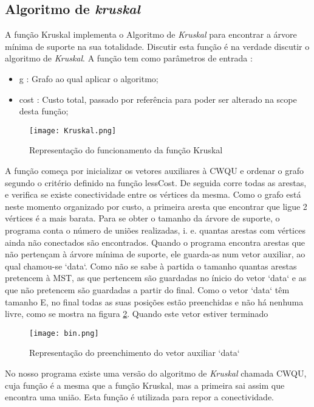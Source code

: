 \documentclass[14pt]{article}
\begin{document}
    \subsection[Kruskal]{Algoritmo de \emph{kruskal}} 
    A função Kruskal implementa o Algoritmo de \emph{Kruskal} para encontrar a árvore mínima de suporte na sua totalidade. Discutir esta função é
    na verdade discutir o algoritmo de \emph{Kruskal}. A função tem como parâmetros de entrada :
    \begin{itemize}
        \item g : Grafo ao qual aplicar o algoritmo;
        \item cost : Custo total, passado por referência para poder ser alterado na scope desta função;
    \end{itemize}
    \begin{figure}[H]
        \centenring
        \texttt{[image: Kruskal.png]}
        \caption {Representação do funcionamento da função Kruskal}
        \label{fig:kruskal}
    \end{figure}
    A função começa por inicializar os vetores auxiliares à CWQU e ordenar o grafo segundo o critério definido na função lessCost.
    De seguida corre todas as arestas, e verifica se existe conectividade entre os vértices da mesma.
    Como o grafo está neste momento organizado por custo, a primeira aresta que encontrar que ligue 2 vértices é a mais barata.
    Para se obter o tamanho da árvore de suporte, o programa conta o número de uniões realizadas, i. e. quantas arestas com vértices
    ainda não conectados são encontrados.
    Quando o programa encontra arestas que não pertençam à árvore mínima de suporte, ele guarda-as num vetor auxiliar, ao qual chamou-se `data`.
    Como não se sabe à partida o tamanho quantas arestas pretencem à MST, as que pertencem são guardadas no ínicio do vetor `data` e as que não
    pretencem são guardadas a partir do final.
    Como o vetor `data` têm tamanho E, no final todas as suas posições estão preenchidas e não há nenhuma livre, como se mostra na figura \ref{fig:bin}. Quando este vetor estiver terminado
    \begin{figure}[H]
           \centering
           \texttt{[image: bin.png]}
           \caption{Representação do preenchimento do vetor auxiliar `data`}
           \label{fig:bin}
    \end{figure}

    No nosso programa existe uma versão do algoritmo de \emph{Kruskal} chamada CWQU, cuja função é a mesma que a função Kruskal, mas a primeira
    sai assim que encontra uma união. Esta função é utilizada para repor a conectividade.
\end{document}
